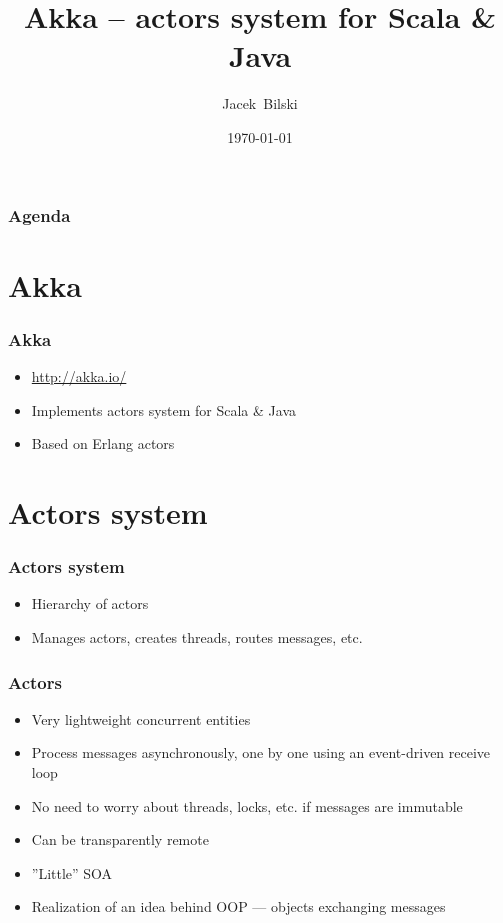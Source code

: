 \documentclass[xcolor=dvipsnames]{beamer}
\title{Akka -- actors system for Scala \& Java}
\author{Jacek~Bilski}
\date{\today}
\begin{document}
\begin{frame}
\titlepage
\end{frame}

\begin{frame}
\frametitle{Agenda}
\tableofcontents[pausesections]
\end{frame}

\section{Akka}

\begin{frame}
\frametitle{Akka}
\begin{itemize}
\item \href{http://akka.io/}{http://akka.io/}
\item Implements actors system for Scala \& Java
\item Based on Erlang actors
\end{itemize}
\end{frame}


\section{Actors system}

\begin{frame}
\frametitle{Actors system}
\begin{itemize}
\item Hierarchy of actors
\item Manages actors, creates threads, routes messages, etc.
\end{itemize}
\end{frame}

\begin{frame}
\frametitle{Actors}
\begin{itemize}
\item Very lightweight concurrent entities
\item Process messages asynchronously, one by one using an event-driven receive loop
\item No need to worry about threads, locks, etc. if messages are immutable
\item Can be transparently remote
\item ''Little'' SOA
\item Realization of an idea behind OOP --- objects exchanging messages
\end{itemize}
\end{frame}
\end{document}
